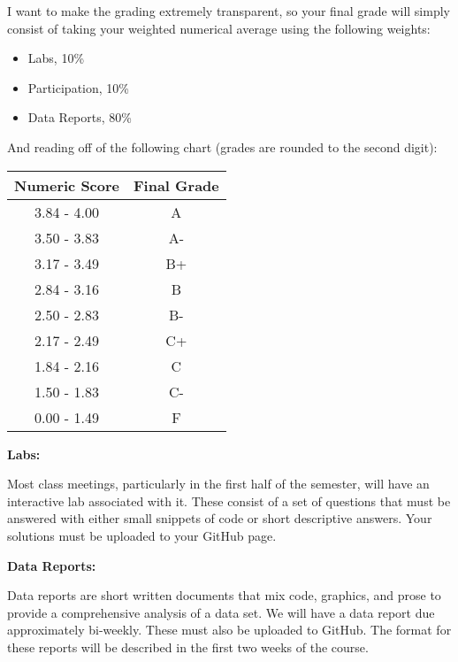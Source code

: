 \documentclass[12pt]{article}
\begin{document}
I want to make the grading extremely transparent, so your final grade will
simply consist of taking your weighted numerical average using the following
weights:

\begin{itemize}\setlength\itemsep{0em}
\item Labs, 10\%
\item Participation, 10\%
\item Data Reports, 80\%
\end{itemize}

And reading off of the following chart (grades are rounded to the
second digit):

\begin{center}
\begin{tabular}{c || c}
Numeric Score & Final Grade \\
\hline \hline
3.84 - 4.00 & A  \\
3.50 - 3.83 & A- \\
3.17 - 3.49 & B+ \\
2.84 - 3.16 & B  \\
2.50 - 2.83 & B- \\
2.17 - 2.49 & C+ \\
1.84 - 2.16 & C  \\
1.50 - 1.83 & C- \\
0.00 - 1.49 & F
\end{tabular}
\end{center}

\newpage

\textbf{Labs:} \vspace{6pt}

Most class meetings, particularly in the first half of the semester,
will have an interactive lab associated with it. These consist of a
set of questions that must be answered with either small snippets of
code or short descriptive answers. Your solutions must be uploaded
to your GitHub page.

\vspace{0.4cm}

\textbf{Data Reports:} \vspace{6pt}

Data reports are short written documents that mix code, graphics,
and prose to provide a comprehensive analysis of a data set.
We will have a data report due approximately bi-weekly. These must
also be uploaded to GitHub. The format for these reports will be
described in the first two weeks of the course.

\vspace{0.4cm}
\end{document}
